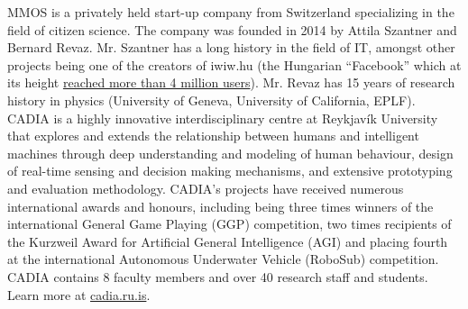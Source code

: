 \documentclass[11pt]{article}
\begin{document}
MMOS is a privately held start-up company from Switzerland specializing in the field
of citizen science. The company was founded in 2014 by Attila Szantner and
Bernard Revaz. Mr. Szantner has a long history in the field of IT, amongst other
projects being one of the creators of iwiw.hu (the Hungarian “Facebook” which at its
height \href{http://en.wikipedia.org/wiki/IWiW}{reached more than 4 million users}). Mr.
Revaz has 15 years of research history in physics (University of Geneva, University
of California, EPLF).\\


CADIA is a highly innovative interdisciplinary centre at Reykjavík University that
explores and extends the relationship between humans and intelligent machines
through deep understanding and modeling of human behaviour, design of real-time
sensing and decision making mechanisms, and extensive prototyping and evaluation
methodology. CADIA’s projects have received numerous international awards and
honours, including being three times winners of the international General Game
Playing (GGP) competition, two times recipients of the Kurzweil Award for Artificial
General Intelligence (AGI) and placing fourth at the international Autonomous
Underwater Vehicle (RoboSub) competition. CADIA contains 8 faculty members and
over 40 research staff and students. Learn more at \href{http://cadia.ru.is/}{cadia.ru.is}.

\end{document}
